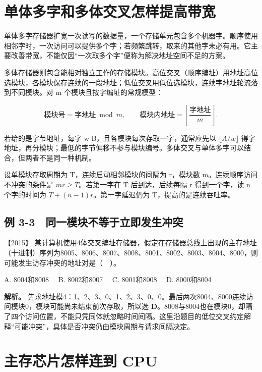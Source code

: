\section{单体多字和多体交叉怎样提高带宽}\label{co-03-04}

单体多字存储器扩宽一次读写的数据量，一个存储单元包含多个机器字。顺序使用相邻字时，一次访问可以提供多个字；若频繁跳转，取来的其他字未必有用。它主要改善带宽，不能仅因``一次取多个字''便称为解决地址空间不足的方案。

多体存储器则包含能相对独立工作的存储模块。高位交叉（顺序编址）用地址高位选模块，各模块保存连续的一段地址；低位交叉用低位选模块，连续字地址轮流落到不同模块。对 m 个模块且按字编址的常规模型：

\[
\text{模块号}=\text{字地址}\bmod m,\qquad
\text{模块内地址}=\left\lfloor\frac{\text{字地址}}m\right\rfloor.
\]

若给的是字节地址，每字 w B，且各模块每次存取一字，通常应先以 \(\lfloor A/w\rfloor\) 得字地址，再分模块；最低的字节偏移不参与模块编号。多体交叉与单体多字可以结合，但两者不是同一种机制。

设单模块存取周期为 T，连续启动相邻模块的间隔为 r，模块数 m。连续顺序访问不冲突的条件是 \(mr\ge T\)。若第一字在 T 后到达，后续每隔 r 得到一个字，读 n 个字的时间为 \(T+(n-1)r\)。第一字延迟仍为 T，提高的是连续吞吐率。

\subsection{例 3-3　同一模块不等于立即发生冲突}\label{co-ex3-3}

\noindent{}【2015】 某计算机使用4体交叉编址存储器，假定在存储器总线上出现的主存地址（十进制）序列为8005、8006、8007、8008、8001、8002、8003、8004、8000，则可能发生访存冲突的地址对是（　）。

A. 8004和8008　 B. 8002和8007　 C. 8001和8008　 D. 8000和8004


\textbf{解析。} 先求地址模4：1、2、3、0、1、2、3、0、0。最后两次8004、8000连续访问模块0，模块可能尚未结束前次存取，所以选 \textbf{D}。8008与8004也在模块0，却隔了四个访问位置，不能只凭同体就忽略时间间隔。这里沿题目的低位交叉约定解释``可能冲突''，具体是否冲突仍由模块周期与请求间隔决定。

\section{主存芯片怎样连到 CPU}\label{co-03-05}

